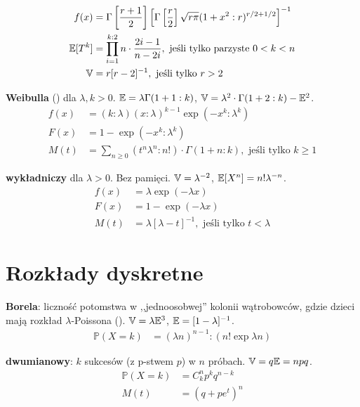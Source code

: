 \begin{multicols*}{2}
\begin{enumx}
	\begin{align*}
		f(x) & = \Gamma \left[\frac{r+1}{2}\right] \left[\Gamma \left[\frac r 2\right] \sqrt{r \pi} (1 + x^2 : r)^{r/2+1/2} \right]^{-1} \\
		\mathbb{E} [T^k] & = \prod_{i = 1}^{k:2} n \cdot \frac{2i - 1}{n - 2i}, \mbox{ jeśli tylko parzyste } 0 < k < n \\
		\mathbb{V} & = r [r-2]^{-1}, \mbox{ jeśli tylko } r > 2
	\end{align*}
	\item \textbf{Weibulla} () dla $\lambda, k > 0$.
	$\mathbb{E}  = \lambda \Gamma (1 + 1 : k)$, 
	$\mathbb{V} = \lambda^2 \cdot \Gamma(1 + 2 : k) - \mathbb{E}^2$. 
	\begin{align*}
		f(x) & = (k : \lambda) (x : \lambda)^{k-1} \exp (-x^k: \lambda^k)\\
		F(x) & = 1 - \exp (- x^k : \lambda ^k) \\
		M(t) & = \sum_{n \ge 0} (t^n \lambda ^n : n!) \cdot \Gamma(1 + n : k), \mbox{ jeśli tylko } k \ge 1
	\end{align*}
	\item \textbf{wykładniczy} dla $\lambda > 0$. Bez pamięci.
	$\mathbb{V} = \lambda^{-2}$, $\mathbb{E}[X^n] = n! \lambda^{-n}$.
	\begin{align*}
		f(x) & = \lambda \exp(- \lambda x)\\
		F(x) & = 1 - \exp(-\lambda x)\\
		M(t) & = \lambda [\lambda - t]^{-1}, \mbox{ jeśli tylko } t < \lambda
	\end{align*}
\end{enumx}

	\vfill
	\columnbreak

\section*{Rozkłady dyskretne}
\begin{enumx}
	\item \textbf{Borela}: liczność potomstwa w ,,jednoosobwej'' kolonii wątrobowców, gdzie dzieci mają rozkład $\lambda$-Poissona ().
	$\mathbb{V} = \lambda \mathbb{E}^3$, $\mathbb{E} = [1-\lambda]^{-1}$.
	\begin{align*}
		\mathbb P(X = k) & = (\lambda n)^{n-1} : (n! \exp \lambda n)
	\end{align*}

	\item \textbf{dwumianowy}: $k$ sukcesów (z p-stwem $p$) w $n$ próbach.
	$\mathbb{V} = q \mathbb{E}= npq$.
	\begin{align*}
		\mathbb P(X = k) & = C_k^n p^k q^{n-k} \\
		M(t) & = (q + pe^t)^n
	\end{align*}


\end{enumx}
\end{multicols*}

